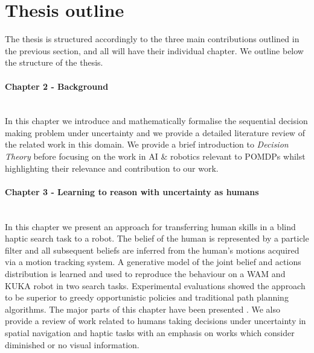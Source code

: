 \section{Thesis outline}

The thesis is structured accordingly to the three main contributions outlined in the previous section, 
and all will have their individual chapter. We outline below the structure of the thesis.

\begin{minipage}[c]{0.9\textwidth}
\paragraph{Chapter 2 - Background}\\
In this chapter we introduce and mathematically formalise the sequential decision making problem 
under uncertainty and we provide a detailed literature review of the related work in this domain.
We provide a brief introduction to \textit{Decision Theory} before focusing on the work 
in AI \& robotics relevant to POMDPs whilst highlighting their relevance and contribution to our work. 
\end{minipage}

\begin{minipage}[c]{0.9\textwidth}
\paragraph{Chapter 3 - Learning to reason with uncertainty as humans}\\
In this chapter we present an approach for transferring human skills in a blind haptic 
search task to a robot. The belief of the human is represented by a particle filter and 
all subsequent beliefs are inferred from the human's motions acquired via a motion tracking
system. A generative model of the joint belief and actions distribution is learned and used
to reproduce the behaviour on a WAM and KUKA robot in two search tasks. Experimental 
evaluations showed the approach to be superior to greedy opportunistic policies and traditional
path planning algorithms. The major parts of this chapter have been presented \cite{Chambrier2014}.
We also provide a review of work related to humans taking decisions under uncertainty 
in spatial navigation and haptic tasks with an emphasis on works which consider diminished or no 
visual information. 
\end{minipage}


